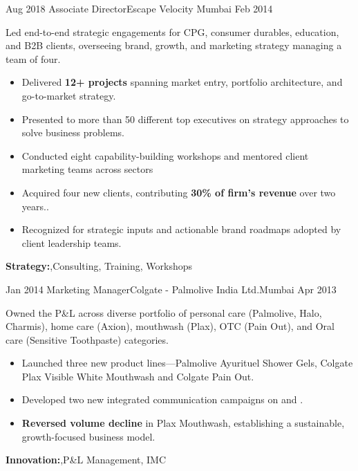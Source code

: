 \begin{experiences}
  \experience
    {Aug 2018}     {Associate Director}{Escape Velocity} {Mumbai} 
    {Feb 2014}    {
Led end-to-end strategic engagements for CPG, consumer durables, education, and B2B clients, overseeing brand, growth, and marketing strategy managing a team of four.
                      \begin{itemize}
        \item {Delivered \textbf{12+ projects} spanning market entry, portfolio architecture, and go-to-market strategy.}
        \item {Presented to more than 50 different top executives on strategy approaches to solve business problems.}
        \item {Conducted eight capability-building workshops and mentored client marketing teams across sectors}
        \item {Acquired four new clients, contributing \textbf{30\% of firm’s revenue} over two years..}
        \item {Recognized for strategic inputs and actionable brand roadmaps adopted by client leadership teams.}                                                              
                      \end{itemize}
                    }
        {\textbf{Strategy:},Consulting, Training, Workshops} 
  \emptySeparator

  \experience
    {Jan 2014}     {Marketing Manager}{Colgate - Palmolive India Ltd.}{Mumbai}
    {Apr 2013}    {
Owned the P\&L across diverse portfolio of personal care (Palmolive, Halo, Charmis), home care (Axion), mouthwash (Plax), OTC (Pain Out), and Oral care (Sensitive Toothpaste) categories. 
                      \begin{itemize}
        \item {Launched three new product lines—Palmolive Ayurituel Shower Gels, Colgate Plax Visible White Mouthwash and Colgate Pain Out.}
        \item {Developed two new integrated communication campaigns on {} and {}.}
        \item {\textbf{Reversed volume decline} in  Plax Mouthwash, establishing a sustainable, growth-focused business model.}
                      \end{itemize}
                    }
        {\textbf{Innovation:},P\&L Management, IMC} 
  \emptySeparator


\end{experiences}
